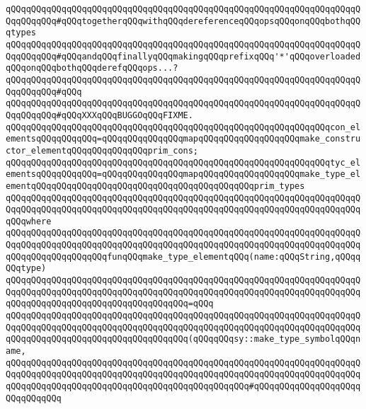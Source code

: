 \verb|qQQqqQQqqQQqqQQqqQQqqQQqqQQqqQQqqQQqqQQqqQQqqQQqqQQqqQQqqQQqqQQqqQQqqQQqqQQqqQQq#qQQqtogetherqQQqwithqQQqdereferenceqQQqopsqQQqonqQQqbothqQQqtypes|\newline
\verb|qQQqqQQqqQQqqQQqqQQqqQQqqQQqqQQqqQQqqQQqqQQqqQQqqQQqqQQqqQQqqQQqqQQqqQQqqQQqqQQq#qQQqandqQQqfinallyqQQqmakingqQQqprefixqQQq'*'qQQqoverloadedqQQqonqQQqbothqQQqderefqQQqops...?|\newline
\verb|qQQqqQQqqQQqqQQqqQQqqQQqqQQqqQQqqQQqqQQqqQQqqQQqqQQqqQQqqQQqqQQqqQQqqQQqqQQqqQQq#qQQq|\newline
\verb|qQQqqQQqqQQqqQQqqQQqqQQqqQQqqQQqqQQqqQQqqQQqqQQqqQQqqQQqqQQqqQQqqQQqqQQqqQQqqQQq#qQQqXXXqQQqBUGGOqQQqFIXME.|\newline
\newline
\newline
\newline
\verb|qQQqqQQqqQQqqQQqqQQqqQQqqQQqqQQqqQQqqQQqqQQqqQQqqQQqqQQqqQQqqQQqcon_elementsqQQqqQQqqQQq=qQQqqQQqqQQqqQQqmapqQQqqQQqqQQqqQQqqQQqmake_constructor_elementqQQqqQQqqQQqqQQqprim_cons;|\newline
\newline
\verb|qQQqqQQqqQQqqQQqqQQqqQQqqQQqqQQqqQQqqQQqqQQqqQQqqQQqqQQqqQQqqQQqtyc_elementsqQQqqQQqqQQq=qQQqqQQqqQQqqQQqmapqQQqqQQqqQQqqQQqqQQqmake_type_elementqQQqqQQqqQQqqQQqqQQqqQQqqQQqqQQqqQQqqQQqqQQqprim_types|\newline
\verb|qQQqqQQqqQQqqQQqqQQqqQQqqQQqqQQqqQQqqQQqqQQqqQQqqQQqqQQqqQQqqQQqqQQqqQQqqQQqqQQqqQQqqQQqqQQqqQQqqQQqqQQqqQQqqQQqqQQqqQQqqQQqqQQqqQQqqQQqqQQqqQQqwhere|\newline
\verb|qQQqqQQqqQQqqQQqqQQqqQQqqQQqqQQqqQQqqQQqqQQqqQQqqQQqqQQqqQQqqQQqqQQqqQQqqQQqqQQqqQQqqQQqqQQqqQQqqQQqqQQqqQQqqQQqqQQqqQQqqQQqqQQqqQQqqQQqqQQqqQQqqQQqqQQqqQQqqQQqfunqQQqmake_type_elementqQQq(name:qQQqString,qQQqqQQqtype)|\newline
\verb|qQQqqQQqqQQqqQQqqQQqqQQqqQQqqQQqqQQqqQQqqQQqqQQqqQQqqQQqqQQqqQQqqQQqqQQqqQQqqQQqqQQqqQQqqQQqqQQqqQQqqQQqqQQqqQQqqQQqqQQqqQQqqQQqqQQqqQQqqQQqqQQqqQQqqQQqqQQqqQQqqQQqqQQqqQQqqQQq=qQQq|\newline
\verb|qQQqqQQqqQQqqQQqqQQqqQQqqQQqqQQqqQQqqQQqqQQqqQQqqQQqqQQqqQQqqQQqqQQqqQQqqQQqqQQqqQQqqQQqqQQqqQQqqQQqqQQqqQQqqQQqqQQqqQQqqQQqqQQqqQQqqQQqqQQqqQQqqQQqqQQqqQQqqQQqqQQqqQQqqQQqqQQq(qQQqqQQqsy::make_type_symbolqQQqname,|\newline
\verb|qQQqqQQqqQQqqQQqqQQqqQQqqQQqqQQqqQQqqQQqqQQqqQQqqQQqqQQqqQQqqQQqqQQqqQQqqQQqqQQqqQQqqQQqqQQqqQQqqQQqqQQqqQQqqQQqqQQqqQQqqQQqqQQqqQQqqQQqqQQqqQQqqQQqqQQqqQQqqQQqqQQqqQQqqQQqqQQqqQQqqQQqqQQq#qQQqqQQqqQQqqQQqqQQqqQQqqQQqqQQq|\newline
